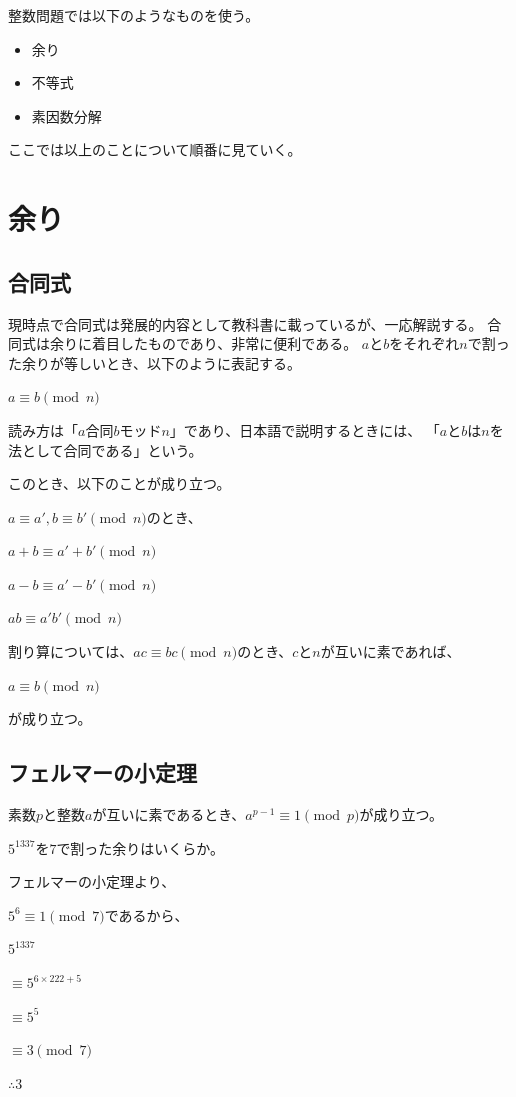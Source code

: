 \documentclass[uplatex,dvipdfmx]{jsbook}
\begin{document}
整数問題では以下のようなものを使う。

\begin{itemize}
    \item {余り}
    \item {不等式}
    \item {素因数分解}
\end{itemize}

ここでは以上のことについて順番に見ていく。

\section{余り}
\subsection{合同式}
現時点で合同式は発展的内容として教科書に載っているが、一応解説する。
合同式は余りに着目したものであり、非常に便利である。
$a$と$b$をそれぞれ$n$で割った余りが等しいとき、以下のように表記する。

$a \equiv b \pmod n$

読み方は「$a$合同$b$モッド$n$」であり、日本語で説明するときには、
「$a$と$b$は$n$を法として合同である」という。

このとき、以下のことが成り立つ。

$a \equiv a', b \equiv b' \pmod n$のとき、

$a+b \equiv a'+b' \pmod n$

$a-b \equiv a'-b' \pmod n$

$ab \equiv a'b' \pmod n$

割り算については、$ac \equiv bc \pmod n$のとき、$c$と$n$が互いに素であれば、

$a \equiv b \pmod n$

が成り立つ。

\subsection{フェルマーの小定理}
素数$p$と整数$a$が互いに素であるとき、$a^{p-1}\equiv 1 \pmod p$が成り立つ。

\begin{problem}[例題]
    $5^{1337}$を$7$で割った余りはいくらか。

    フェルマーの小定理より、

    $5^6 \equiv 1 \pmod 7$であるから、

    $5^{1337}$

    $\equiv 5^{6\times 222 + 5}$

    $\equiv 5^5$

    $\equiv 3 \pmod 7$

    $\therefore 3$
\end{problem}
\end{document}
